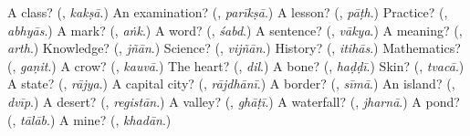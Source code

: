 \begin{tcolorbox}[breakable,colback=teal!4,colframe=teal!35!black,title={Before you move on}]
A class? (\textbf{}, \emph{kakṣā}.) An examination? (\textbf{}, \emph{parīkṣā}.) A lesson? (\textbf{}, \emph{pāṭh}.) Practice? (\textbf{}, \emph{abhyās}.) A mark? (\textbf{}, \emph{aṅk}.) A word? (\textbf{}, \emph{śabd}.) A sentence? (\textbf{}, \emph{vākya}.) A meaning? (\textbf{}, \emph{arth}.) Knowledge? (\textbf{}, \emph{jñān}.) Science? (\textbf{}, \emph{vijñān}.) History? (\textbf{}, \emph{itihās}.) Mathematics? (\textbf{}, \emph{gaṇit}.) A crow? (\textbf{}, \emph{kauvā}.) The heart? (\textbf{}, \emph{dil}.) A bone? (\textbf{}, \emph{haḍḍī}.) Skin? (\textbf{}, \emph{tvacā}.) A state? (\textbf{}, \emph{rājya}.) A capital city? (\textbf{}, \emph{rājdhānī}.) A border? (\textbf{}, \emph{sīmā}.) An island? (\textbf{}, \emph{dvīp}.) A desert? (\textbf{}, \emph{registān}.) A valley? (\textbf{}, \emph{ghāṭī}.) A waterfall? (\textbf{}, \emph{jharnā}.) A pond? (\textbf{}, \emph{tālāb}.) A mine? (\textbf{}, \emph{khadān}.)
\end{tcolorbox}

